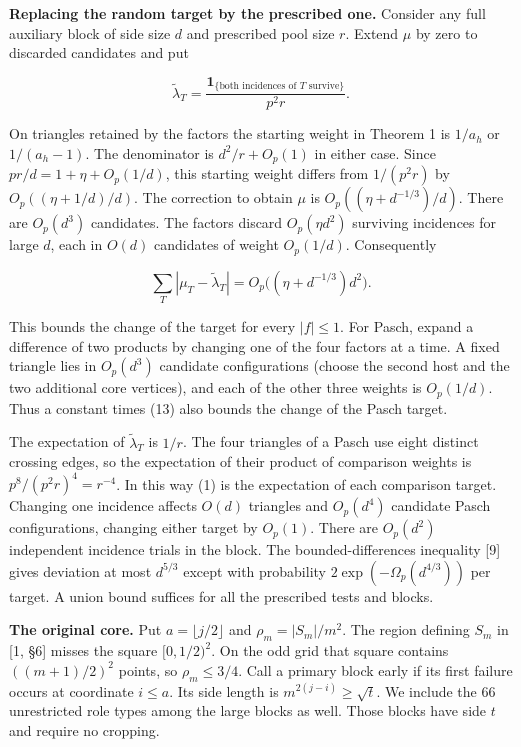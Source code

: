 \documentclass[english,11pt,a4paper]{article}
\begin{document}
\textbf{Replacing the random target by the prescribed one.} Consider any full auxiliary block of side size \(d\) and prescribed pool size \(r\). Extend \(\mu\) by zero to discarded candidates and put

\[\widetilde\lambda_T=\frac{\mathbf1_{\{\text{both incidences of }T\text{ survive}\}}}{p^2r}.\]

On triangles retained by the factors the starting weight in Theorem 1 is \(1/a_h\) or \(1/(a_h-1)\). The denominator is \(d^2/r+O_p(1)\) in either case. Since \(pr/d=1+\eta+O_p(1/d)\), this starting weight differs from \(1/(p^2r)\) by \(O_p((\eta+1/d)/d)\). The correction to obtain \(\mu\) is \(O_p((\eta+d^{-1/3})/d)\). There are \(O_p(d^3)\) candidates. The factors discard \(O_p(\eta d^2)\) surviving incidences for large \(d\), each in \(O(d)\) candidates of weight \(O_p(1/d)\). Consequently

\[\sum_T|\mu_T-\widetilde\lambda_T|
     =O_p\big((\eta+d^{-1/3})d^2\big).
\tag{13}\]

This bounds the change of the target for every \(|f|\le1\). For Pasch, expand a difference of two products by changing one of the four factors at a time. A fixed triangle lies in \(O_p(d^3)\) candidate configurations (choose the second host and the two additional core vertices), and each of the other three weights is \(O_p(1/d)\). Thus a constant times (13) also bounds the change of the Pasch target.

The expectation of \(\widetilde\lambda_T\) is \(1/r\). The four triangles of a Pasch use eight distinct crossing edges, so the expectation of their product of comparison weights is \(p^8/(p^2r)^4=r^{-4}\). In this way (1) is the expectation of each comparison target. Changing one incidence affects \(O(d)\) triangles and \(O_p(d^4)\) candidate Pasch configurations, changing either target by \(O_p(1)\). There are \(O_p(d^2)\) independent incidence trials in the block. The bounded-differences inequality {[}9{]} gives deviation at most \(d^{5/3}\) except with probability \(2\exp(-\Omega_p(d^{4/3}))\) per target. A union bound suffices for all the prescribed tests and blocks.

\textbf{The original core.} Put \(a=\lfloor j/2\rfloor\) and \(\rho_m=|S_m|/m^2\). The region defining \(S_m\) in {[}1, §6{]} misses the square \([0,1/2)^2\). On the odd grid that square contains \(((m+1)/2)^2\) points, so \(\rho_m\le 3/4\). Call a primary block early if its first failure occurs at coordinate \(i\le a\). Its side length is \(m^{2(j-i)}\ge\sqrt t\). We include the 66 unrestricted role types among the large blocks as well. Those blocks have side \(t\) and require no cropping.
\end{document}
